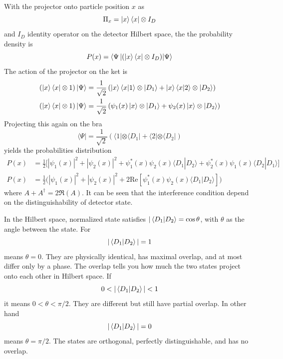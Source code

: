 \documentclass[../../../main.tex]{subfiles}
\begin{document}
With the projector onto particle position \( x \)  as
\begin{equation*}
  \Pi_x = \ket{x}\langle x| \otimes I_D
\end{equation*}
and $I_D$ identity operator on the detector Hilbert space, the the probability density is
\begin{equation*}
  P(x) = \langle \Psi \ket{ (\ket{x}\langle x| \otimes I_D) | \Psi}
\end{equation*}
The action of the projector on the ket is
\begin{align*}
  \left(\ket{x}\langle x| \otimes 1\right)|\Psi\rangle
   & =  \frac{1}{\sqrt{2}} \left(\left|x\right\rangle \braket{x  | 1} \otimes |D_1\rangle + \ket{x} \braket{x  | 2}\otimes  |D_2\rangle\right) \\
  \left(\ket{x}\langle x| \otimes 1\right)|\Psi\rangle
   & =  \frac{1}{\sqrt{2}} \left( \psi_1(x) \ket{x} \otimes |D_1\rangle + \psi_2(x) \ket{x} \otimes |D_2\rangle \right)
\end{align*}
Projecting this again on the bra
\begin{equation*}
  \langle \Psi | = \frac{1}{\sqrt{2}} \left(\langle 1 | \otimes \langle D_1| + \langle 2 | \otimes \langle D_2 |\right)
\end{equation*}
yields the probabilities distribution
\begin{align*}
  P(x)
   & = \frac{1}{2} \big[ |\psi_1(x)|^2 + |\psi_2(x)|^2 + \psi_1^*(x)\psi_2(x)\langle D_1|D_2\rangle + \psi_2^*(x)\psi_1(x)\langle D_2|D_1\rangle \big] \\
  P(x)
   & =  \frac{1}{2} \big( |\psi_1(x)|^2 + |\psi_2(x)|^2 + 2 \text{Re} \left[ \psi_1^*(x)\psi_2(x)\langle D_1|D_2\rangle \right] \big)
\end{align*}
where $A+ A ^\dagger = 2 \mathfrak{R} (A)$.
It can be seen that the interference condition depend on the distinguishability of detector state.

In the Hilbert space, normalized state satisfies $|\braket{D_1  | D_2 }=\cos \theta$, with $\theta$  as the angle between the state.
For
\begin{equation*}
  |\braket{D_1  | D_2}|=1
\end{equation*}
means $\theta =0$.
They are physically identical, has maximal overlap, and at most differ only by a phase.
The overlap tells you how much the two states project onto each other in Hilbert space.
If
\begin{equation*}
  0<|\braket{D_1  | D_2}|<1
\end{equation*}
it means $0<\theta<\pi/2$.
They are different but still have partial overlap.
In other hand
\begin{equation*}
  |\braket{D_1  | D_2}|=0
\end{equation*}
means $\theta=\pi/2$.
The states are orthogonal, perfectly distinguishable, and has no overlap.
\end{document}
